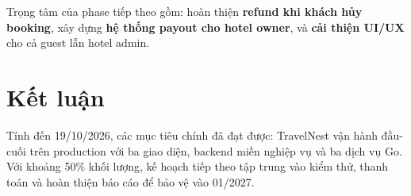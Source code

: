 \documentclass[12pt,a4paper]{article}
\begin{document}
\noindent Trọng tâm của phase tiếp theo gồm: hoàn thiện \textbf{refund khi khách hủy booking}, xây dựng \textbf{hệ thống payout cho hotel owner}, và \textbf{cải thiện UI/UX} cho cả guest lẫn hotel admin.

\section{Kết luận}

Tính đến 19/10/2026, các mục tiêu chính đã đạt được: TravelNest vận hành đầu-cuối trên production với ba giao diện, backend miền nghiệp vụ và ba dịch vụ Go. Với khoảng 50\% khối lượng, kế hoạch tiếp theo tập trung vào kiểm thử, thanh toán và hoàn thiện báo cáo để bảo vệ vào 01/2027.
\end{document}
